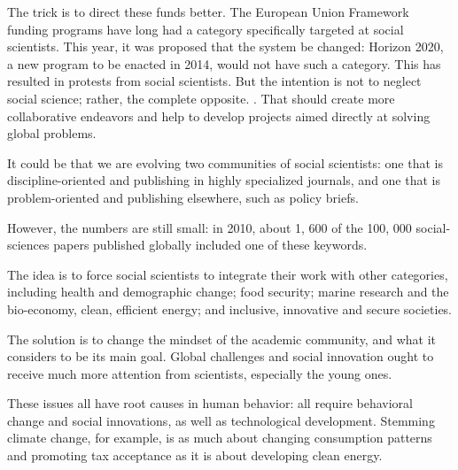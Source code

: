 The trick is to direct these funds better. The European Union Framework
funding programs have long had a category specifically targeted at
social scientists. This year, it was proposed that the system be
changed: Horizon 2020, a new program to be enacted in 2014, would not
have such a category. This has resulted in protests from social
scientists. But the intention is not to neglect social science; rather,
the complete opposite. \linefill.
That should create more collaborative endeavors and help to develop
projects aimed directly at solving global problems.

\begin{listmatch}
	\item
 It could be that we are evolving two communities of social
scientists: one that is discipline-oriented and publishing in highly
specialized journals, and one that is problem-oriented and publishing
elsewhere, such as policy briefs.


\item 
 However, the numbers are still small: in 2010, about 1, 600 of
the 100, 000 social-sciences papers published globally included one of
these keywords.

\item 
The idea is to force social scientists to integrate their work
with other categories, including health and demographic change; food
security; marine research and the bio-economy, clean, efficient energy;
and inclusive, innovative and secure societies.





\item 
The solution is to change the mindset of the academic community,
and what it considers to be its main goal. Global challenges and social
innovation ought to receive much more attention from scientists,
especially the young ones.

\item 
These issues all have root causes in human behavior: all require
behavioral change and social innovations, as well as technological
development. Stemming climate change, for example, is as much about
changing consumption patterns and promoting tax acceptance as it is
about developing clean energy.



\end{listmatch}
